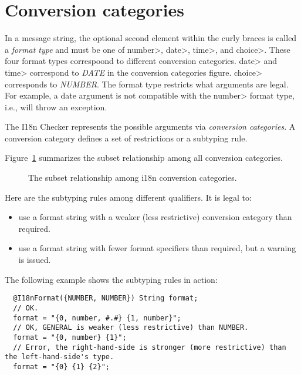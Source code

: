 \section{Conversion categories\label{i18n-format-conversion-catgeories}}

In a message string, the optional second element within the curly braces is
called a \emph{format type} and must be one of \<number>, \<date>,
\<time>, and \<choice>. These four format types correspoond to different
conversion categories. \<date> and \<time> correspond to \emph{DATE} in the
conversion categories figure. \<choice> corresponds to \emph{NUMBER}.
The format type restricts what arguments are legal.
For example, a date argument is not compatible with
the \<number> format type, i.e.,  will throw an exception.

The I18n Checker represents the possible arguments via \emph{conversion
  categories}.  A conversion category defines a set of restrictions or a
subtyping rule.

Figure~\ref{i18n-format-category} summarizes the subset
relationship among all conversion categories.

\begin{figure}
    \caption{The subset relationship among
        i18n
        conversion categories.}
    \label{i18n-format-category}
\end{figure}

\label{i18n-formatter-format-subtyping}
Here are the subtyping rules among different
qualifiers.
It is legal to:

\begin{itemize}
\item use a format string with a weaker (less restrictive) conversion category than required.
\item use a format string with fewer format specifiers than required, but a warning is issued.
\end{itemize}

The following example shows the subtyping rules in action:

\begin{Verbatim}
  @I18nFormat({NUMBER, NUMBER}) String format;
  // OK.
  format = "{0, number, #.#} {1, number}";
  // OK, GENERAL is weaker (less restrictive) than NUMBER.
  format = "{0, number} {1}";
  // Error, the right-hand-side is stronger (more restrictive) than the left-hand-side's type.
  format = "{0} {1} {2}";
\end{Verbatim}

